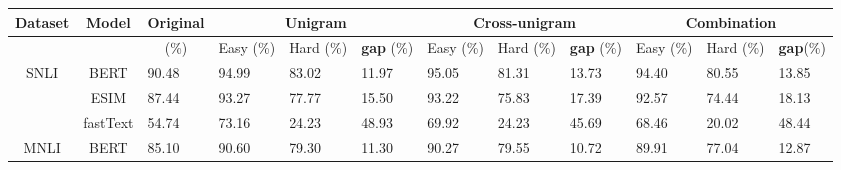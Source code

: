 \begin{table}[th]
\scriptsize
\centering
\begin{tabular}{c|c|llll|lll|lll}
Dataset                                      & \multicolumn{1}{c|}{Model} & \multicolumn{1}{c|}{Original} & \multicolumn{3}{c|}{Unigram}                                                                  & \multicolumn{3}{c|}{Cross-unigram}                                                            & \multicolumn{3}{c}{\textbf{Combination}}                                                                  \\ \hline
                                             &                            & \multicolumn{1}{c|}{(\%)}      & \multicolumn{1}{c}{Easy (\%)} & \multicolumn{1}{c}{Hard (\%)} & \multicolumn{1}{c|}{\textbf{gap} (\%)} & \multicolumn{1}{c}{Easy (\%)} & \multicolumn{1}{c}{Hard (\%)} & \multicolumn{1}{c|}{\textbf{gap} (\%)} & \multicolumn{1}{c}{Easy (\%)} & \multicolumn{1}{c}{Hard (\%)} & \multicolumn{1}{c}{\textbf{gap}(\%)} \\ \hline
\multicolumn{1}{c|}{\multirow{3}{*}{SNLI}}   & BERT                       & \multicolumn{1}{l|}{90.48}    & 94.99                         & 83.02                         & 11.97                         & 95.05                         & 81.31                         & 13.73                         & 94.40                         & 80.55                         & 13.85                        \\
\multicolumn{1}{c|}{}                        & ESIM                       & \multicolumn{1}{l|}{87.44}    & 93.27                         & 77.77                         & 15.50                         & 93.22                         & 75.83                         & 17.39                         & 92.57                         & 74.44                         & 18.13                        \\
\multicolumn{1}{c|}{}                        & fastText                   & \multicolumn{1}{l|}{54.74}    & 73.16                         & 24.23                         & 48.93                         & 69.92                         & 24.23                         & 45.69                         & 68.46                         & 20.02                         & 48.44                        \\ \hline
\multicolumn{1}{c|}{\multirow{3}{*}{MNLI}}   & BERT                       & \multicolumn{1}{l|}{85.10}    & 90.60                         & 79.30                         & 11.30                         & 90.27                         & 79.55                         & 10.72                         & 89.91                         & 77.04                         & 12.87                        \\

\end{tabular}
\end{table}
